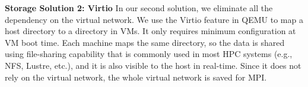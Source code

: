\textbf{Storage Solution 2: Virtio}
In our second solution, we eliminate all the dependency on the virtual network. We use the Virtio feature \cite{russell2008virtio} in QEMU to map a host directory to a directory in VMs. It only requires minimum configuration at VM boot time. Each machine maps the same directory, so the data is shared using file-sharing capability that is commonly used in most HPC systems (e.g., NFS, Lustre, etc.), and it is also visible to the host in real-time. Since it does not rely on the virtual network, the whole virtual network is saved for MPI.

